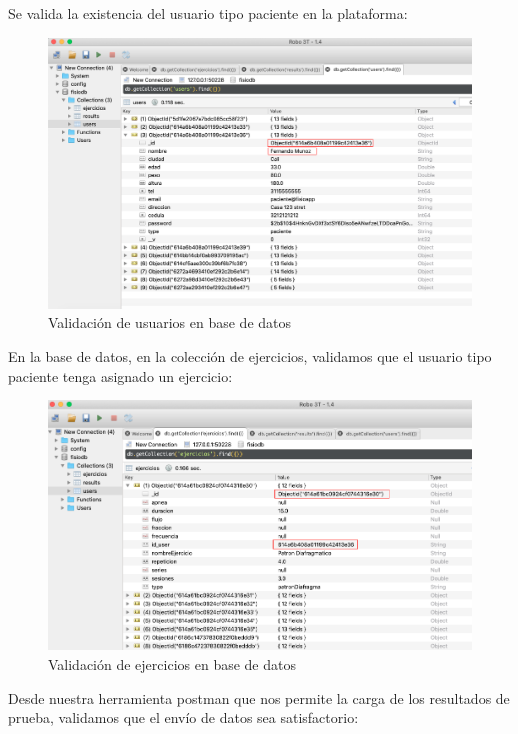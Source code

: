 \documentclass[12pt]{article}
\begin{document}
Se valida la existencia del usuario tipo paciente en la plataforma:
\begin{figure}[ht]
\centering
\includegraphics[scale=0.3]{imag/TEST1User.png}
\caption{Validación de usuarios en base de datos}
\label{6}
\end{figure}
\FloatBarrier

En la base de datos, en la colección de ejercicios, validamos que el usuario tipo paciente tenga asignado un ejercicio:

\begin{figure}[ht]
\centering
\includegraphics[scale=0.3]{imag/TEST2Ejercicio.png}
\caption{Validación de ejercicios en base de datos}
\label{6}
\end{figure}
\FloatBarrier

Desde nuestra herramienta postman que nos permite la carga de los resultados de prueba, validamos que el envío de datos sea satisfactorio:
\end{document}
